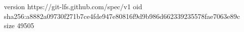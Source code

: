 version https://git-lfs.github.com/spec/v1
oid sha256:a8882a09730f271b7ce4fde947e80816f9d9b986d662339235578fae7063e89c
size 49505
